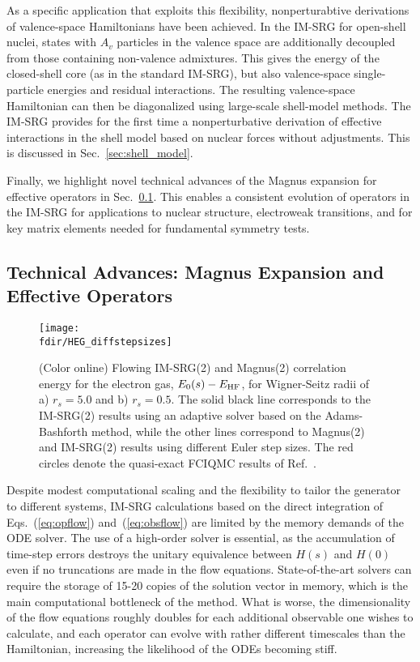 As a specific application that exploits this flexibility,
nonperturabtive derivations of valence-space Hamiltonians have been
achieved. In the IM-SRG for open-shell nuclei, states with $A_v$
particles in the valence space are additionally decoupled from those
containing non-valence admixtures. This gives the energy of the
closed-shell core (as in the standard IM-SRG), but also valence-space
single-particle energies and residual interactions. The resulting
valence-space Hamiltonian can then be diagonalized using large-scale
shell-model methods. The IM-SRG provides for the first time a
nonperturbative derivation of effective interactions in the shell
model based on nuclear forces without adjustments. This is discussed
in Sec.~\ref{sec:shell_model}.

Finally, we highlight novel technical advances of the Magnus expansion
for effective operators in Sec.~\ref{sec:magnus}. This enables a
consistent evolution of operators in the IM-SRG for applications to
nuclear structure, electroweak transitions, and for key matrix elements
needed for fundamental symmetry tests.

\subsection{Technical Advances: Magnus Expansion and Effective Operators}
\label{sec:magnus}

\begin{figure}[t]
\begin{center}
\texttt{[image: \\fdir/HEG\_diffstepsizes]}
\caption{\label{fig:timestep_HEG}
(Color online) Flowing IM-SRG(2) and Magnus(2) correlation energy for 
the electron gas, $E_0(s)-E_{\rm HF}$, for Wigner-Seitz radii of a)
$r_s=5.0$ and b) $r_s=0.5$. The solid black line corresponds to the
IM-SRG(2) results using an adaptive solver based on the
Adams-Bashforth method, while the other lines correspond to Magnus(2)
and IM-SRG(2) results using different Euler step sizes. The red
circles denote the quasi-exact FCIQMC results of
Ref.~\cite{Shepherd:2012hl}.}
\end{center}
\end{figure}

Despite modest computational scaling and the flexibility to tailor the
generator to different systems, IM-SRG calculations based on the
direct integration of Eqs.~(\ref{eq:opflow}) and~(\ref{eq:obsflow}) are
limited by the memory demands of the ODE solver. The use of a
high-order solver is essential, as the accumulation of time-step
errors destroys the unitary equivalence between $H(s)$ and $H(0)$ even
if no truncations are made in the flow equations. State-of-the-art
solvers can require the storage of 15-20 copies of the solution vector
in memory, which is the main computational bottleneck of the method.
What is worse, the dimensionality of the flow equations roughly
doubles for each additional observable one wishes to calculate, and
each operator can evolve with rather different timescales than the
Hamiltonian, increasing the likelihood of the ODEs becoming
stiff.

